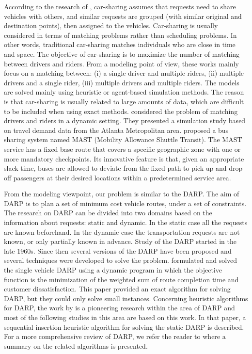 \documentclass[preprint,authoryear,12pt]{elsarticle}
\begin{document}
According to the research of \cite{Agatz}, car-sharing assumes that requests need to share vehicles with others, and similar requests are grouped (with similar original and destination points), then assigned to the vehicles. Car-sharing is usually considered in terms of matching problems rather than scheduling problems. In other words, traditional car-sharing matches individuals who are close in time and space. The objective of car-sharing is to maximize the number of matching between drivers and riders. From a modeling point of view, these works mainly focus \citep[see, e.g., ][]{Agatz} on a matching between: (i) a single driver and multiple riders, (ii) multiple drivers and a single rider, (iii) multiple drivers and multiple riders. The models are solved mainly using heuristic or agent-based simulation methods. The reason is that car-sharing is usually related to large amounts of data, which are difficult to be included when using exact methods. \cite{Agatz2011} considered the problem of matching drivers and riders in a dynamic setting. They presented a simulation study based on travel demand data from the Atlanta Metropolitan area. \cite{Quadrifoglio}  proposed a bus sharing system named MAST (Mobility Allowance Shuttle Transit). The MAST service has a fixed base route that covers a specific geographic zone with one or more mandatory checkpoints. Its innovative feature is that, given an appropriate slack time, buses are allowed to deviate from the fixed path to pick up and drop off passengers at their desired locations within a predetermined service area.

From the modeling viewpoint, our problem is similar to the DARP. The aim of DARP is to plan a set of minimum cost vehicle routes, under a set of constraints\citep{Cordeau}. The research on DARP can be divided into two domains based on the information about requests: static and dynamic. In the static case all the requests are known beforehand. In the dynamic case the transportation requests are not known, or only partially known in advance. Study of the DARP started in the late 1960s. Since then several versions of the DARP have been proposed and several techniques were developed to solve the problem. \cite{Psaraftis} formulated and solved the single vehicle DARP using a dynamic program in which the objective function is the minimization of the weighted sum of route completion time and customer dissatisfaction. This paper provided an exact algorithm for solving DARP, but they could only solve small instances. Concerning heuristic algorithms for DARP, the work by \cite{Jaw} is a pioneering research within the area of DARP and most of the following studies in this area are based on this work. In that paper, a sequential insertion heuristic algorithm for solving the static DARP is described. For a more comprehensive review of DARP, we refer the reader to \cite{Cordeau} where a summary on the related algorithms is presented.
\end{document}
